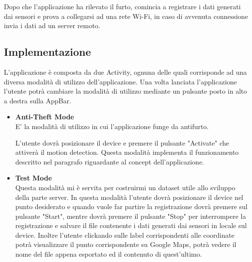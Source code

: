 \documentclass[12pt,a4paper,openright,twoside]{report}
\begin{document}
Dopo che l'applicazione ha rilevato il furto, comincia a registrare i dati generati dai sensori e prova a collegarsi ad una rete Wi-Fi, in caso di avvenuta connessione invia i dati ad un server remoto.
\newpage
\subsection{Implementazione}
L'applicazione è composta da due Activity, ognuna delle quali corrisponde ad una diversa modalità di utilizzo dell'applicazione. Una volta lanciata l'applicazione l'utente potrà cambiare la modalità di utilizzo mediante un pulsante posto in alto a destra sulla AppBar.
\begin{itemize}
\item \textbf{Anti-Theft Mode}\\
E' la modalità di utilizzo in cui l'applicazione funge da antifurto. 

L'utente dovrà posizionare il device e premere il pulsante "Activate" che attiverà il motion detection. Questa modalità implementa il funzionamento descritto nel paragrafo riguardante al concept dell'applicazione.

\item \textbf{Test Mode}\\
Questa modalità mi è servita per costruirmi un dataset utile allo sviluppo della parte server. In questa modalità l'utente dovrà posizionare il device
nel punto desiderato e quando vuole far partire la registrazione dovrà premere sul pulsante "Start", mentre dovrà premere il pulsante "Stop" per interrompere la registrazione e salvare il file contenente i dati generati dai sensori in locale sul device. Inoltre l'utente clickando sulle label corrispondenti alle coordinate potrà visualizzare il punto corrispondente su Google Maps, potrà vedere il nome del file appena esportato ed il contenuto di quest'ultimo.
\end{itemize}
\end{document}
